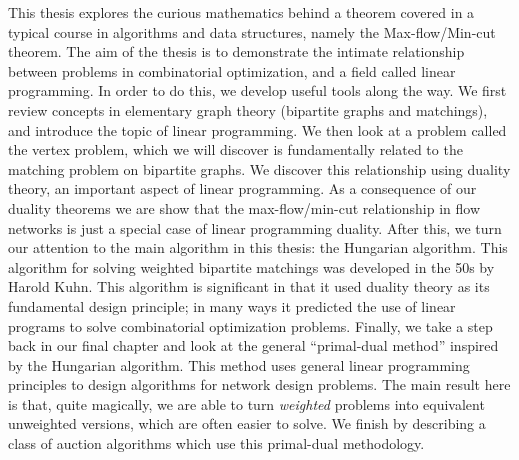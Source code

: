 This thesis explores the curious mathematics behind a theorem covered in a typical course in 
algorithms and data structures, namely the Max-flow/Min-cut theorem. The aim of the thesis is to 
demonstrate the intimate relationship between problems in combinatorial optimization, and a field 
called linear programming. In order to do this, we develop useful tools along the way. We first 
review concepts in elementary graph theory (bipartite graphs and matchings), and introduce the topic 
of linear programming. We then look at a problem called the vertex problem, which we will discover 
is fundamentally related to the matching problem on bipartite graphs. We discover this relationship 
using duality theory, an important aspect of linear programming. As a consequence of our duality 
theorems we are show that the max-flow/min-cut relationship in flow networks is just a special case of 
linear programming duality. After this, we turn our attention to the main algorithm in this thesis:
the Hungarian algorithm. This algorithm for solving weighted bipartite matchings was developed in the 
50s by Harold Kuhn. This algorithm is significant in that it used duality theory as its fundamental 
design principle; in many ways it predicted the use of linear programs to solve combinatorial 
optimization problems. Finally, we take a step back in our final chapter and look at the general 
``primal-dual method'' inspired by the Hungarian algorithm. This method uses general linear programming 
principles to design algorithms for network design problems. The main result here is that, quite 
magically, we are able to turn \emph{weighted} problems into equivalent unweighted versions, which 
are often easier to solve. We finish by describing a class of auction algorithms which use this 
primal-dual methodology.
